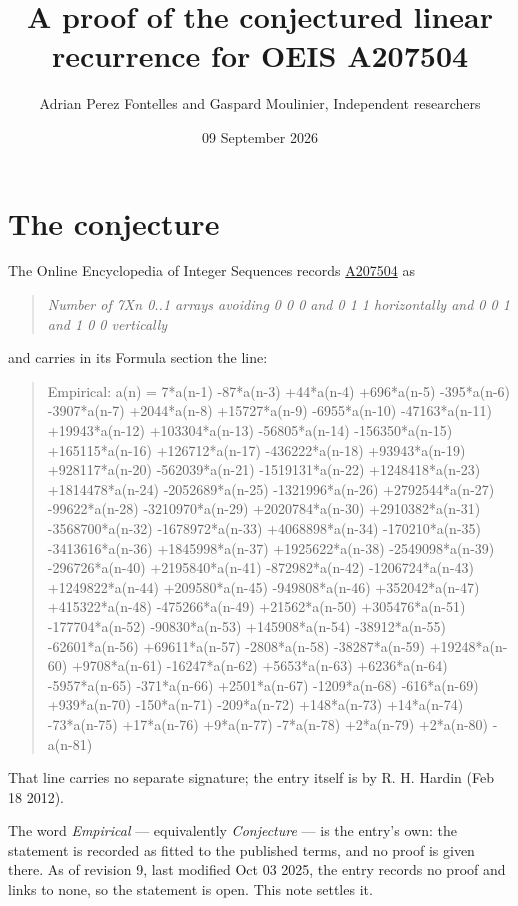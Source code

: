 \documentclass[11pt]{article}
\title{A proof of the conjectured linear recurrence for OEIS A207504}
\author{Adrian Perez Fontelles and Gaspard Moulinier, Independent researchers}
\date{09 September 2026}
\theoremstyle{definition}
\begin{document}
\maketitle
\section{The conjecture}

The Online Encyclopedia of Integer Sequences records \href{https://oeis.org/A207504}{A207504} as

\begin{quote}\itshape Number of 7Xn 0..1 arrays avoiding 0 0 0 and 0 1 1 horizontally and 0 0 1 and 1 0 0 vertically\end{quote}

and carries in its Formula section the line:

\begin{quote}\ttfamily Empirical: a(n) = 7*a(n-1) -87*a(n-3) +44*a(n-4) +696*a(n-5) -395*a(n-6) -3907*a(n-7) +2044*a(n-8) +15727*a(n-9) -6955*a(n-10) -47163*a(n-11) +19943*a(n-12) +103304*a(n-13) -56805*a(n-14) -156350*a(n-15) +165115*a(n-16) +126712*a(n-17) -436222*a(n-18) +93943*a(n-19) +928117*a(n-20) -562039*a(n-21) -1519131*a(n-22) +1248418*a(n-23) +1814478*a(n-24) -2052689*a(n-25) -1321996*a(n-26) +2792544*a(n-27) -99622*a(n-28) -3210970*a(n-29) +2020784*a(n-30) +2910382*a(n-31) -3568700*a(n-32) -1678972*a(n-33) +4068898*a(n-34) -170210*a(n-35) -3413616*a(n-36) +1845998*a(n-37) +1925622*a(n-38) -2549098*a(n-39) -296726*a(n-40) +2195840*a(n-41) -872982*a(n-42) -1206724*a(n-43) +1249822*a(n-44) +209580*a(n-45) -949808*a(n-46) +352042*a(n-47) +415322*a(n-48) -475266*a(n-49) +21562*a(n-50) +305476*a(n-51) -177704*a(n-52) -90830*a(n-53) +145908*a(n-54) -38912*a(n-55) -62601*a(n-56) +69611*a(n-57) -2808*a(n-58) -38287*a(n-59) +19248*a(n-60) +9708*a(n-61) -16247*a(n-62) +5653*a(n-63) +6236*a(n-64) -5957*a(n-65) -371*a(n-66) +2501*a(n-67) -1209*a(n-68) -616*a(n-69) +939*a(n-70) -150*a(n-71) -209*a(n-72) +148*a(n-73) +14*a(n-74) -73*a(n-75) +17*a(n-76) +9*a(n-77) -7*a(n-78) +2*a(n-79) +2*a(n-80) -a(n-81)\end{quote}

That line carries no separate signature; the entry itself is by R. H. Hardin (Feb 18 2012).

The word {\itshape Empirical} --- equivalently {\itshape Conjecture} --- is the entry's own: the statement is recorded as fitted to the published terms, and no proof is given there. As of revision 9, last modified Oct 03 2025, the entry records no proof and links to none, so the statement is open. This note settles it.
\end{document}
